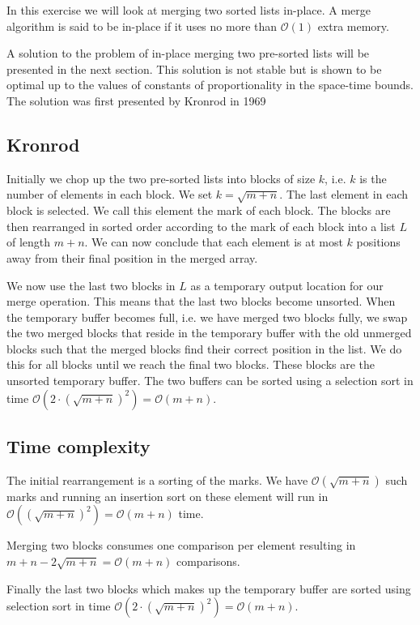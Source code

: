 \documentclass[a4paper,oneside,article,11pt]{memoir}
\begin{document}
In this exercise we will look at merging two sorted lists in-place. A merge algorithm is said to be in-place if it uses no more than $\mathcal{O}(1)$ extra memory.

A solution to the problem of in-place merging two pre-sorted lists will be presented in the next section. This solution is not stable but is shown to be optimal up to the values of constants of proportionality in the space-time bounds. The solution was first presented by Kronrod in 1969 \cite{Kronrod}

\subsection{Kronrod}
Initially we chop up the two pre-sorted lists into blocks of size $k$, i.e. $k$ is the number of elements in each block. We set $k =\sqrt{m+n}$. The last element in each block is selected. We call this element the mark of each block. The blocks are then rearranged in sorted order according to the mark of each block into a list $L$ of length $m+n$. We can now conclude that each element is at most $k$ positions away from their final position in the merged array.

We now use the last two blocks in $L$ as a temporary output location for our merge operation. This means that the last two blocks become unsorted. When the temporary buffer becomes full, i.e. we have merged two blocks fully, we swap the two merged blocks that reside in the temporary buffer with the old unmerged blocks such that the merged blocks find their correct position in the list. We do this for all blocks until we reach the final two blocks. These blocks are the unsorted temporary buffer. The two buffers can be sorted using a selection sort in time $\mathcal{O}(2\cdot\left(\sqrt{m+n}\right)^2) = \mathcal{O}(m+n)$.

\subsection{Time complexity}
The initial rearrangement is a sorting of the marks. We have $\mathcal{O}(\sqrt{m+n})$ such marks and running an insertion sort on these element will run in $\mathcal{O}( (\sqrt{m+n})^2) = \mathcal{O}(m+n)$ time.

Merging two blocks consumes one comparison per element resulting in $m+n - 2\sqrt{m+n} = \mathcal{O}(m+n)$ comparisons.

Finally the last two blocks which makes up the temporary buffer are sorted using selection sort in time $\mathcal{O}(2\cdot\left(\sqrt{m+n}\right)^2) = \mathcal{O}(m+n)$.
\end{document}
